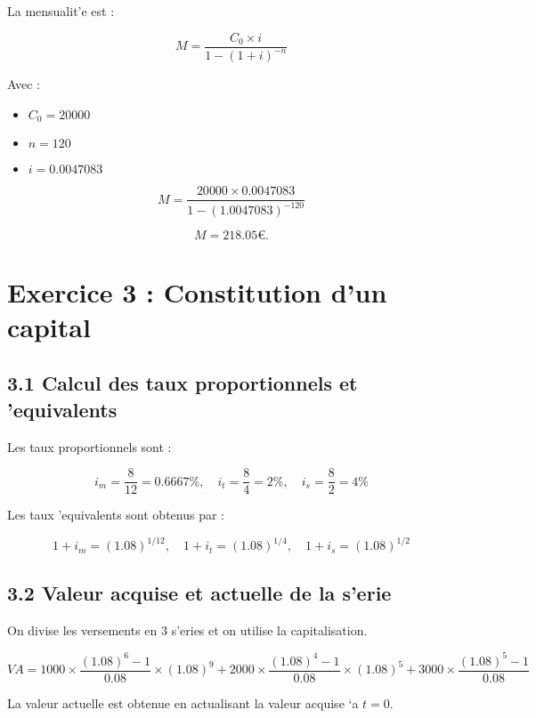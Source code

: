 \documentclass[a4paper, 12pt]{article}
\begin{document}
	La mensualit'e est :
	
	\begin{equation}
		M = \frac{C_0 \times i}{1 - (1 + i)^{-n}}
	\end{equation}
	
	Avec :
	\begin{itemize}
		\item $ C_0 = 20 000 $
		\item $ n = 120 $
		\item $ i = 0.0047083 $
	\end{itemize}
	
	\begin{equation}
		M = \frac{20 000 \times 0.0047083}{1 - (1.0047083)^{-120}}
	\end{equation}
	
	\begin{equation}
		M = 218.05 \euro.
	\end{equation}
	
	\section*{Exercice 3 : Constitution d'un capital}
	
	\subsection*{3.1 Calcul des taux proportionnels et '{e}quivalents}
	
	Les taux proportionnels sont :
	
	\begin{equation}
		i_m = \frac{8}{12} = 0.6667\%, \quad i_t = \frac{8}{4} = 2\%, \quad i_s = \frac{8}{2} = 4\%
	\end{equation}
	
	Les taux '{e}quivalents sont obtenus par :
	
	\begin{equation}
		1 + i_m = (1.08)^{1/12}, \quad 1 + i_t = (1.08)^{1/4}, \quad 1 + i_s = (1.08)^{1/2}
	\end{equation}
	
	\subsection*{3.2 Valeur acquise et actuelle de la s'erie}
	
	On divise les versements en 3 s'eries et on utilise la capitalisation.
	
	\begin{equation}
		VA = 1000 \times \frac{(1.08)^6 -1}{0.08} \times (1.08)^9 + 2000 \times \frac{(1.08)^4 -1}{0.08} \times (1.08)^5 + 3000 \times \frac{(1.08)^5 -1}{0.08}
	\end{equation}
	
	La valeur actuelle est obtenue en actualisant la valeur acquise `{a} $ t = 0 $.
	
\end{document}
